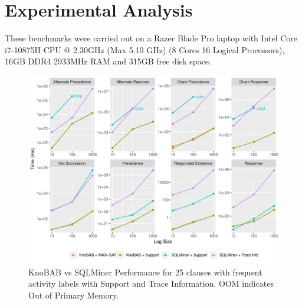
\section{Experimental Analysis}\label{sec:exp}
These benchmarks were carried out on a Razer Blade Pro laptop with Intel Core i7-10875H CPU @ 2.30GHz (Max 5.10 GHz) (8 Cores 16 Logical Processors), 16GB DDR4 2933MHz RAM and 315GB free disk space.

\begin{figure}[!t]
	\centering
	\includegraphics[width=.8\textwidth]{images/sqlminer_benchmark.pdf}
	\caption{KnoBAB vs SQLMiner Performance for 25  clauses with frequent activity labels with Support and Trace Information. OOM indicates Out of Primary Memory.}\label{fig:vsSQL}
\end{figure}


